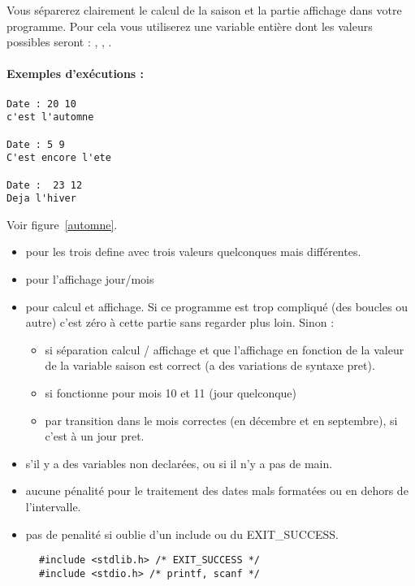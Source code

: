 Vous séparerez clairement le calcul de la saison et la partie
affichage dans votre programme. Pour cela vous utiliserez une variable
entière  dont les valeurs possibles seront : ,
, .


\paragraph{Exemples d'exécutions :}
\begin{small}
\begin{verbatim}
Date : 20 10
c'est l'automne

Date : 5 9
C'est encore l'ete

Date :  23 12
Deja l'hiver
\end{verbatim}
\end{small}
  \begin{correction}
Voir figure~\ref{automne}.
\begin{baremeenv}
   \begin{itemize}
\item {} pour les trois define avec trois valeurs quelconques mais
  différentes.
    \item {} pour l'affichage jour/mois
    \item {} pour calcul et affichage. Si ce
      programme est trop compliqué (des boucles ou autre) c'est zéro à
      cette partie sans regarder plus loin. Sinon :
      \begin{itemize}
\item {} si séparation calcul / affichage et que l'affichage en fonction
  de la valeur de la variable saison est correct (a des variations de
  syntaxe pret).
      \item {} si fonctionne pour mois 10 et 11  (jour quelconque)
     \item {} par transition dans le mois correctes (en décembre et
       en septembre),  si c'est à un jour pret.
     \end{itemize}
     \item {} s'il y a des variables non declarées, ou
       si il n'y a pas de main.
\item aucune pénalité pour le traitement des dates mals formatées ou
  en dehors de l'intervalle.
\item pas de penalité si oublie d'un include ou du EXIT\_SUCCESS.
   \end{itemize}
\end{baremeenv}
\begin{figure}[htbp]
 \begin{small}
\begin{verbatim}
#include <stdlib.h> /* EXIT_SUCCESS */
#include <stdio.h> /* printf, scanf */


\end{verbatim}
\end{small}
\end{figure}
\end{correction}

